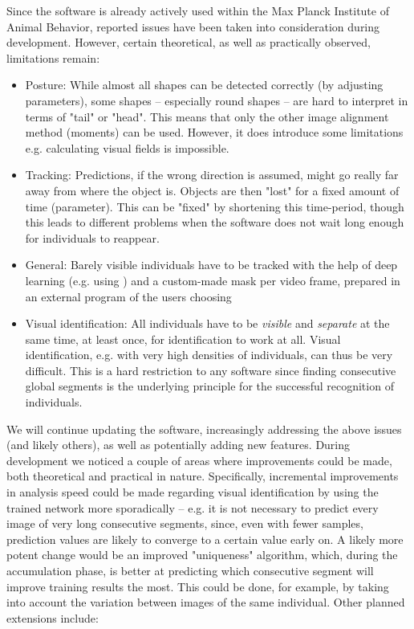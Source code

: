 \documentclass[9pt,lineno]{elife}
\begin{document}

Since the software is already actively used within the Max Planck Institute of Animal Behavior, reported issues have been taken into consideration during development. However, certain theoretical, as well as practically observed, limitations remain:

\begin{itemize}
	\item Posture: While almost all shapes can be detected correctly (by adjusting parameters), some shapes -- especially round shapes -- are hard to interpret in terms of "tail" or "head". This means that only the other image alignment method (moments) can be used. However, it does introduce some limitations e.g. calculating visual fields is impossible.
	\item Tracking: Predictions, if the wrong direction is assumed, might go really far away from where the object is. Objects are then "lost" for a fixed amount of time (parameter). This can be "fixed" by shortening this time-period, though this leads to different problems when the software does not wait long enough for individuals to reappear.
	\item General: Barely visible individuals have to be tracked with the help of deep learning (e.g. using \cite{Cae+17}) and a custom-made mask per video frame, prepared in an external program of the users choosing
	\item Visual identification: All individuals have to be \textit{visible} and \textit{separate} at the same time, at least once, for identification to work at all. Visual identification, e.g. with very high densities of individuals, can thus be very difficult. This is a hard restriction to any software since finding consecutive global segments is the underlying principle for the successful recognition of individuals.
\end{itemize}

We will continue updating the software, increasingly addressing the above issues (and likely others), as well as potentially adding new features. During development we noticed a couple of areas where improvements could be made, both theoretical and practical in nature. Specifically, incremental improvements in analysis speed could be made regarding visual identification by using the trained network more sporadically -- e.g. it is not necessary to predict every image of very long consecutive segments, since, even with fewer samples, prediction values are likely to converge to a certain value early on. A likely more potent change would be an improved "uniqueness" algorithm, which, during the accumulation phase, is better at predicting which consecutive segment will improve training results the most. This could be done, for example, by taking into account the variation between images of the same individual. Other planned extensions include:
\end{document}
